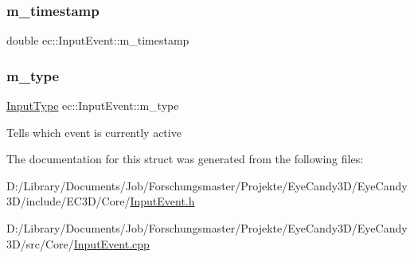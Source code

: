 \mbox{\label{structec_1_1_input_event_ada54908facf585cb714bd6712d8f6c4d}} 
\subsubsection{\texorpdfstring{m\+\_\+timestamp}{m\_timestamp}}
{\footnotesize\ttfamily double ec\+::\+Input\+Event\+::m\+\_\+timestamp}

\mbox{\label{structec_1_1_input_event_a07aadaf18da2952478b803bbd4122bb7}} 
\subsubsection{\texorpdfstring{m\+\_\+type}{m\_type}}
{\footnotesize\ttfamily \mbox{\hyperlink{namespaceec_a5de6bdb8c4b2ed6e590e721ec998f964}{Input\+Type}} ec\+::\+Input\+Event\+::m\+\_\+type}

Tells which event is currently active 

The documentation for this struct was generated from the following files\+:\begin{DoxyCompactItemize}
\item 
D\+:/\+Library/\+Documents/\+Job/\+Forschungsmaster/\+Projekte/\+Eye\+Candy3\+D/\+Eye\+Candy3\+D/include/\+E\+C3\+D/\+Core/\mbox{\hyperlink{_input_event_8h}{Input\+Event.\+h}}\item 
D\+:/\+Library/\+Documents/\+Job/\+Forschungsmaster/\+Projekte/\+Eye\+Candy3\+D/\+Eye\+Candy3\+D/src/\+Core/\mbox{\hyperlink{_input_event_8cpp}{Input\+Event.\+cpp}}\end{DoxyCompactItemize}
